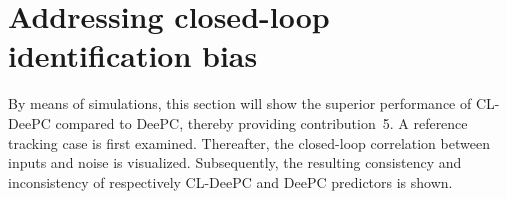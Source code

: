 \section{Addressing closed-loop identification bias}\label{sec:CL_ID_issue}
%
\noindent By means of simulations, this section will show the superior performance of \ac{CL-DeePC} compared to \ac{DeePC}, thereby providing contribution~5. A reference tracking case is first examined. Thereafter, the closed-loop correlation between inputs and noise is visualized. Subsequently, the resulting consistency and inconsistency of respectively \ac{CL-DeePC} and \ac{DeePC} predictors is shown.

